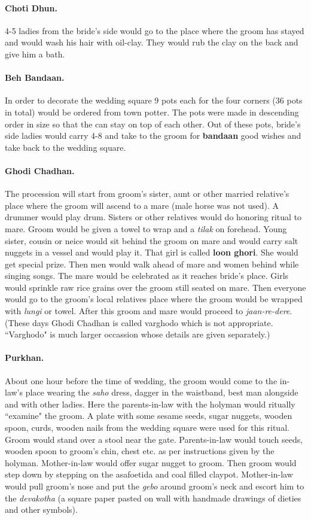 \paragraph{Choti Dhun.} 4-5 ladies from the bride's side would go to the place
where the groom has stayed and would wash his hair with oil-clay. They would
rub the clay on the back and give him a bath.

\paragraph{Beh Bandaan.} In order to decorate the wedding square 9 pots each
for the four corners (36 pots in total) would be ordered from town potter. The
pots were made in descending order in size so that the can stay on top of each
other. Out of these pots, bride's side ladies would carry 4-8 and take to the
groom for \textbf{bandaan} good wishes and take back to the wedding square.

\paragraph{Ghodi Chadhan.} The procession will start from groom's sister, aunt
or other married relative's place where the groom will ascend to a mare (male
horse was not used). A drummer would play drum. Sisters or other
relatives would do honoring ritual to mare. Groom would be given a towel to
wrap and a \textit{tilak} on forehead. Young sister, cousin or neice would sit
behind the groom on mare and would carry salt nuggets in a vessel and would
play it. That girl is called \textbf{loon ghori}. She would get special prize.
Then men would walk ahead of mare and women behind while singing songs. The
mare would be celebrated as it reaches bride's place. Girls would sprinkle raw
rice grains over the groom still seated on mare. Then everyone would go to the
groom's local relatives place where the groom would be wrapped with
\textit{lungi} or towel. After this groom and mare would proceed to
\textit{jaan-re-dere}. (These days Ghodi Chadhan is called varghodo which is
not appropriate. ``Varghodo" is much larger occassion whose details are
given separately.)

\paragraph{Purkhan.} About one hour before the time of wedding, the groom would
come to the in-law's place wearing the \textit{saho} dress, dagger in the
waistband, best man alongside and with other ladies. Here the parents-in-law
with the holyman would ritually ``examine" the groom. A plate with some sesame
seeds, sugar nuggets, wooden spoon, curds, wooden nails from the wedding square
were used for this ritual. Groom would stand over a stool near the gate.
Parents-in-law would touch seeds, wooden spoon to groom's chin, chest etc. as
per instructions given by the holyman. Mother-in-law would offer sugar nugget
to groom. Then groom would step down by stepping on the asafoetida and coal
filled claypot. Mother-in-law would pull groom's nose and put the \textit{gebo}
around groom's neck and escort him to the \textit{devakotha} (a square paper
pasted on wall with handmade drawings of dieties and other symbols).


